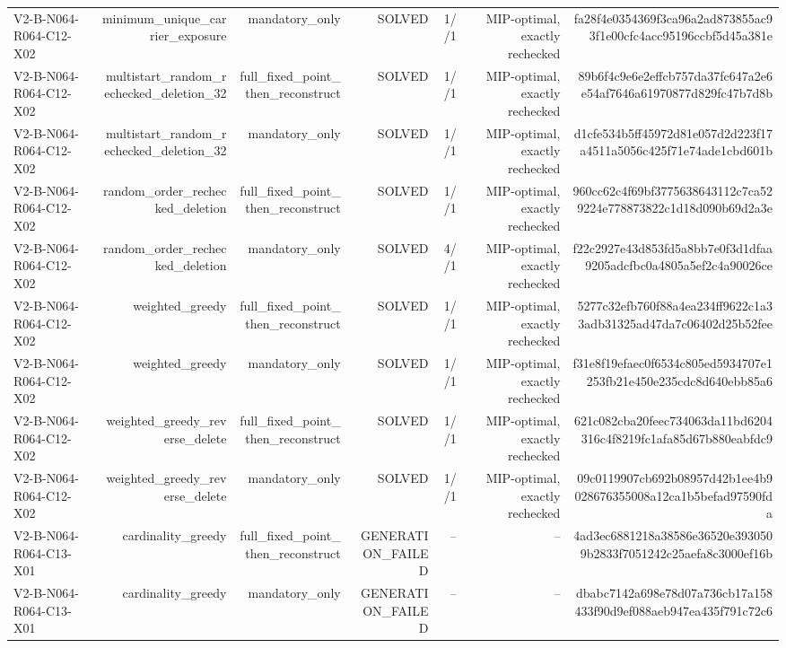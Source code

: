 {\begin{longtable}{lrrrrrr}
V2-B-N064-R064-C12-X02 & minimum\_unique\_carrier\_exposure & mandatory\_only & SOLVED & 1//1 & MIP-optimal, exactly rechecked & fa28f4e0354369f3ca96a2ad873855ac93f1e00cfc4acc95196ccbf5d45a381e \\
V2-B-N064-R064-C12-X02 & multistart\_random\_rechecked\_deletion\_32 & full\_fixed\_point\_then\_reconstruct & SOLVED & 1//1 & MIP-optimal, exactly rechecked & 89b6f4c9e6e2effcb757da37fc647a2e6e54af7646a61970877d829fc47b7d8b \\
V2-B-N064-R064-C12-X02 & multistart\_random\_rechecked\_deletion\_32 & mandatory\_only & SOLVED & 1//1 & MIP-optimal, exactly rechecked & d1cfe534b5ff45972d81e057d2d223f17a4511a5056c425f71e74ade1cbd601b \\
V2-B-N064-R064-C12-X02 & random\_order\_rechecked\_deletion & full\_fixed\_point\_then\_reconstruct & SOLVED & 1//1 & MIP-optimal, exactly rechecked & 960cc62c4f69bf3775638643112c7ca529224e778873822c1d18d090b69d2a3e \\
V2-B-N064-R064-C12-X02 & random\_order\_rechecked\_deletion & mandatory\_only & SOLVED & 4//1 & MIP-optimal, exactly rechecked & f22c2927e43d853fd5a8bb7e0f3d1dfaa9205adcfbc0a4805a5ef2c4a90026ce \\
V2-B-N064-R064-C12-X02 & weighted\_greedy & full\_fixed\_point\_then\_reconstruct & SOLVED & 1//1 & MIP-optimal, exactly rechecked & 5277c32efb760f88a4ea234ff9622c1a33adb31325ad47da7c06402d25b52fee \\
V2-B-N064-R064-C12-X02 & weighted\_greedy & mandatory\_only & SOLVED & 1//1 & MIP-optimal, exactly rechecked & f31e8f19efaec0f6534c805ed5934707e1253fb21e450e235cdc8d640ebb85a6 \\
V2-B-N064-R064-C12-X02 & weighted\_greedy\_reverse\_delete & full\_fixed\_point\_then\_reconstruct & SOLVED & 1//1 & MIP-optimal, exactly rechecked & 621c082cba20feec734063da11bd6204316c4f8219fc1afa85d67b880eabfdc9 \\
V2-B-N064-R064-C12-X02 & weighted\_greedy\_reverse\_delete & mandatory\_only & SOLVED & 1//1 & MIP-optimal, exactly rechecked & 09c0119907cb692b08957d42b1ee4b9028676355008a12ca1b5befad97590fda \\
V2-B-N064-R064-C13-X01 & cardinality\_greedy & full\_fixed\_point\_then\_reconstruct & GENERATION\_FAILED & -- & -- & 4ad3ec6881218a38586e36520e3930509b2833f7051242c25aefa8c3000ef16b \\
V2-B-N064-R064-C13-X01 & cardinality\_greedy & mandatory\_only & GENERATION\_FAILED & -- & -- & dbabc7142a698e78d07a736cb17a158433f90d9ef088aeb947ea435f791c72c6 \\

\end{longtable}}
